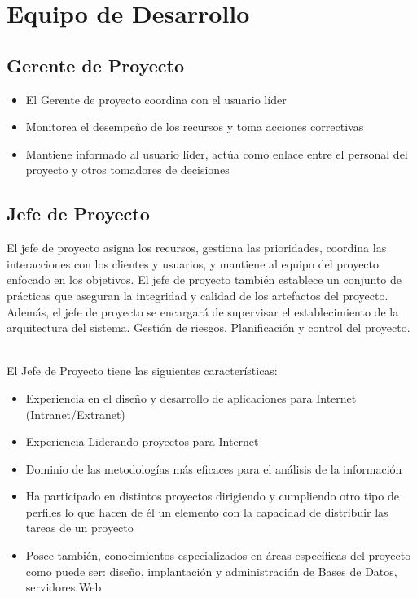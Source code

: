 \section{Equipo de Desarrollo}
	\subsection{Gerente de Proyecto}
		\begin{itemize}
			\item El Gerente de proyecto coordina con el usuario líder
			\item Monitorea el desempeño de los recursos y toma acciones correctivas
			\item Mantiene informado al usuario líder, actúa como enlace entre el
			personal del proyecto y otros tomadores de decisiones
		\end{itemize}
		
	\subsection{Jefe de Proyecto}
		
		El jefe de proyecto asigna los recursos, gestiona las prioridades, coordina las
		interacciones con los clientes y usuarios, y mantiene al equipo del proyecto
		enfocado en los objetivos. El jefe de proyecto también establece un conjunto de
		prácticas que aseguran la integridad y calidad de los artefactos del proyecto.
		Además, el jefe de proyecto se encargará de supervisar el establecimiento de la
		arquitectura del sistema. Gestión de riesgos. Planificación y control del
		proyecto.\\\
		
		El Jefe de Proyecto tiene las siguientes características:
		
		\begin{itemize}
			\item Experiencia en el diseño y desarrollo de aplicaciones  para Internet
			(Intranet/Extranet)
			
			\item Experiencia Liderando proyectos para Internet
			
			\item Dominio de las metodologías más eficaces para el análisis de la
			información
			
			\item Ha participado en distintos proyectos dirigiendo y cumpliendo otro
			tipo de perfiles lo que hacen de él un elemento con la capacidad de
			distribuir las tareas de un proyecto
			
			\item Posee también, conocimientos especializados en áreas específicas del
			proyecto como puede ser: diseño, implantación y administración de Bases de
			Datos, servidores Web
		\end{itemize}
	
